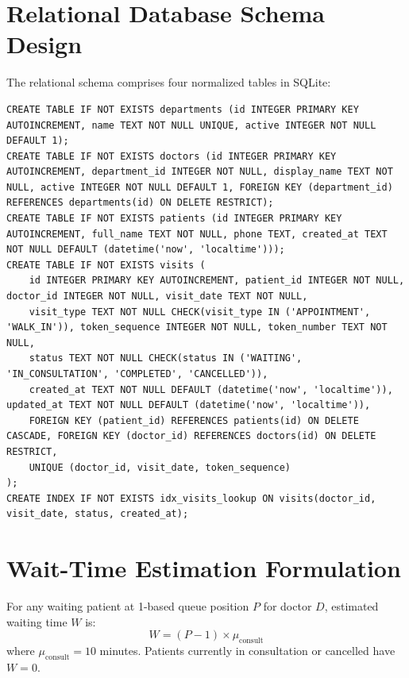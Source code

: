\documentclass[12pt,a4paper,oneside]{report}
\begin{document}
\section{Relational Database Schema Design}
The relational schema comprises four normalized tables in SQLite:
\begin{lstlisting}[style=SqlStyle, caption={DDL Schema Definitions in SQLite}]
CREATE TABLE IF NOT EXISTS departments (id INTEGER PRIMARY KEY AUTOINCREMENT, name TEXT NOT NULL UNIQUE, active INTEGER NOT NULL DEFAULT 1);
CREATE TABLE IF NOT EXISTS doctors (id INTEGER PRIMARY KEY AUTOINCREMENT, department_id INTEGER NOT NULL, display_name TEXT NOT NULL, active INTEGER NOT NULL DEFAULT 1, FOREIGN KEY (department_id) REFERENCES departments(id) ON DELETE RESTRICT);
CREATE TABLE IF NOT EXISTS patients (id INTEGER PRIMARY KEY AUTOINCREMENT, full_name TEXT NOT NULL, phone TEXT, created_at TEXT NOT NULL DEFAULT (datetime('now', 'localtime')));
CREATE TABLE IF NOT EXISTS visits (
    id INTEGER PRIMARY KEY AUTOINCREMENT, patient_id INTEGER NOT NULL, doctor_id INTEGER NOT NULL, visit_date TEXT NOT NULL,
    visit_type TEXT NOT NULL CHECK(visit_type IN ('APPOINTMENT', 'WALK_IN')), token_sequence INTEGER NOT NULL, token_number TEXT NOT NULL,
    status TEXT NOT NULL CHECK(status IN ('WAITING', 'IN_CONSULTATION', 'COMPLETED', 'CANCELLED')),
    created_at TEXT NOT NULL DEFAULT (datetime('now', 'localtime')), updated_at TEXT NOT NULL DEFAULT (datetime('now', 'localtime')),
    FOREIGN KEY (patient_id) REFERENCES patients(id) ON DELETE CASCADE, FOREIGN KEY (doctor_id) REFERENCES doctors(id) ON DELETE RESTRICT,
    UNIQUE (doctor_id, visit_date, token_sequence)
);
CREATE INDEX IF NOT EXISTS idx_visits_lookup ON visits(doctor_id, visit_date, status, created_at);
\end{lstlisting}

\section{Wait-Time Estimation Formulation}
For any waiting patient at 1-based queue position $P$ for doctor $D$, estimated waiting time $W$ is:
\begin{equation}
    W = (P - 1) \times \mu_{\text{consult}}
\end{equation}
where $\mu_{\text{consult}} = 10$ minutes. Patients currently in consultation or cancelled have $W = 0$.

\end{document}

